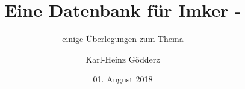\author{Karl-Heinz Gödderz}
\title{Eine Datenbank für Imker -}
\subtitle{einige Überlegungen zum Thema} 
\date{01. August 2018}

\maketitle
\newpage 
\tableofcontents
\newpage
